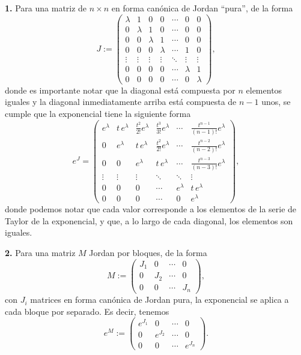 \documentclass[
  11pt,
  letterpaper,
   addpoints,
   answers
  ]{exam}
\begin{document}
\begin{questions}
\begin{solution}
\medskip
\noindent\textbf{1.} Para una matriz de $n\times n$ en forma canónica de Jordan ``pura'', de la forma
\begin{equation}
J:=\begin{pmatrix}
\lambda & 1 & 0 & 0 & \cdots & 0 & 0\\
0 & \lambda & 1 & 0 & \cdots & 0 & 0\\
0 & 0 & \lambda & 1 & \cdots & 0 & 0\\
0 & 0 & 0 & \lambda & \cdots & 1 & 0\\
\vdots & \vdots & \vdots & \vdots & \ddots & \vdots & \vdots\\
0 & 0 & 0 & 0 & \cdots & \lambda & 1\\
0 & 0 & 0 & 0 & \cdots & 0 & \lambda
\end{pmatrix},
\end{equation}
donde es importante notar que la diagonal está compuesta por $n$ elementos iguales y la diagonal inmediatamente arriba está compuesta de $n-1$ unos, se cumple que la exponencial tiene la siguiente forma
\begin{equation}
e^{J}=
\begin{pmatrix}
e^{\lambda} & t\,e^{\lambda} & \tfrac{t^{2}}{2!}e^{\lambda} & \tfrac{t^{3}}{3!}e^{\lambda} & \cdots & \tfrac{t^{n-1}}{(n-1)!}e^{\lambda}\\
0 & e^{\lambda} & t\,e^{\lambda} & \tfrac{t^{2}}{2!}e^{\lambda} & \cdots & \tfrac{t^{n-2}}{(n-2)!}e^{\lambda}\\
0 & 0 & e^{\lambda} & t\,e^{\lambda} & \cdots & \tfrac{t^{n-3}}{(n-3)!}e^{\lambda}\\
\vdots & \vdots & \vdots & \ddots & \ddots & \vdots\\
0 & 0 & 0 & \cdots & e^{\lambda} & t\,e^{\lambda}\\
0 & 0 & 0 & \cdots & 0 & e^{\lambda}
\end{pmatrix},
\end{equation}
donde podemos notar que cada valor corresponde a los elementos de la serie de Taylor de la exponencial, y que, a lo largo de cada diagonal, los elementos son iguales.

\medskip
\noindent\textbf{2.} Para una matriz $M$ Jordan por bloques, de la forma
\begin{equation}
M:=\begin{pmatrix}
J_1 & 0 & \cdots & 0\\
0 & J_2 & \cdots & 0\\
0 & 0 & \cdots & J_n
\end{pmatrix},
\end{equation}
con $J_i$ matrices en forma canónica de Jordan pura, la exponencial se aplica a cada bloque por separado. Es decir, tenemos
\begin{equation}
e^{M}:=\begin{pmatrix}
e^{J_1} & 0 & \cdots & 0\\
0 & e^{J_2} & \cdots & 0\\
0 & 0 & \cdots & e^{J_n}
\end{pmatrix}.
\end{equation}


\end{solution}
\end{questions}
\end{document}
